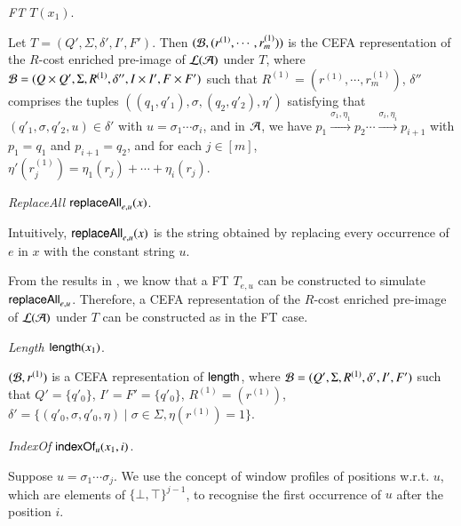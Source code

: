\documentclass{llncs}
\begin{document}
\smallskip
\noindent \emph{FT $T(x_1)$}.

\smallskip

Let $T= (Q', \Sigma, \delta', I', F')$. Then $(\mathcal{B}, (r^{(1)}, \cdots, r^{(1)}_m))$ is the CEFA representation of the $R$-cost enriched pre-image of $\mathcal{L}(\mathcal{A})$ under $T$, where $ \mathcal{B}= (Q \times Q', \Sigma, R^{(1)}, \delta'', I \times I', F \times F')$ such that $R^{(1)}  = (r^{(1)}, \cdots, r^{(1)}_m)$, $\delta''$ comprises the tuples $((q_1, q'_1), \sigma, (q_2, q'_2), \eta')$ satisfying that $(q'_1, \sigma, q'_2, u) \in \delta'$ with $u = \sigma_1 \cdots \sigma_i$, and in $\mathcal{A}$, we have $p_1 \xrightarrow{\sigma_1, \eta_1} p_2 \cdots \xrightarrow{\sigma_i, \eta_i} p_{i+1}$ with $p_1 = q_1$ and $p_{i+1}= q_2$, and for each $j \in [m]$,  $\eta'(r^{(1)}_j) = \eta_1(r_j) + \cdots + \eta_i(r_j)$.
%

\smallskip 

\noindent \emph{ReplaceAll $\mathsf{replaceAll}_{e,u}(x)$}.

\smallskip

Intuitively, $\mathsf{replaceAll}_{e,u}(x)$ is the string obtained by replacing every occurrence of $e$ in $x$ with the constant string $u$.

From the results in \cite{CCH+18}, we know that  a FT $T_{e,u}$ can be constructed to simulate $\mathsf{replaceAll}_{e,u}$. 
Therefore, a CEFA representation of the $R$-cost enriched pre-image of $\mathcal{L}(\mathcal{A})$ under $T$ can be constructed as in the FT case.
% 

\smallskip 

\noindent \emph{Length $\mathsf{length}(x_1)$}.

\smallskip

$(\mathcal{B}, r^{(1)})$ is a CEFA representation of $\mathsf{length}$, where $\mathcal{B} = (Q', \Sigma, R^{(1)}, \delta', I', F')$ such that $Q' = \{q'_0\}$, $I'=F'=\{q'_0\}$, $R^{(1)} = (r^{(1)})$, $\delta' = \{(q'_0, \sigma, q'_0, \eta) \mid \sigma \in \Sigma, \eta(r^{(1)}) = 1\}$.

\smallskip 

\noindent \emph{IndexOf $\mathsf{indexOf}_u(x_1, i)$}.

\smallskip

Suppose $u = \sigma_1 \cdots \sigma_j$. We use the concept of window profiles of positions w.r.t. $u$, which are elements of $\{\bot, \top\}^{j-1}$, to recognise the first occurrence of $u$ after the position $i$. 
\end{document}
